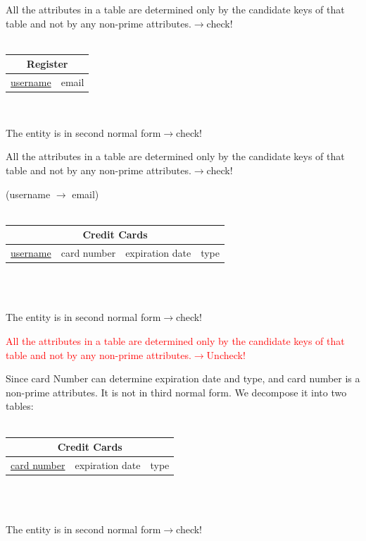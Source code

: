\documentclass[12pt]{article}
\begin{document}
\par All the attributes in a table are determined only by the candidate keys of that table and not by any non-prime attributes.\hfill $\rightarrow$check!\\
~\\
\begin{tabularx}{\textwidth}{|X|X|}
\hline
\multicolumn{2}{|c|}{Register}\\\hline
\underline{username} & email\\\hline
\end{tabularx}
~\\
\par The entity is in second normal form\hfill $\rightarrow$check!
\par All the attributes in a table are determined only by the candidate keys of that table and not by any non-prime attributes.\hfill $\rightarrow$check!
\par (username $\rightarrow$ email)\\
~\\
\begin{tabularx}{\textwidth}{|X|X|X|X|}
\hline
\multicolumn{4}{|c|}{Credit Cards}\\\hline
\underline{username} & card number & expiration date & type\\\hline
\end{tabularx}
~\\~\\
\par The entity is in second normal form\hfill $\rightarrow$check!
\par \textcolor{red}{All the attributes in a table are determined only by the candidate keys of that table and not by any non-prime attributes.\hfill $\rightarrow$Uncheck!}
\par Since card Number can determine expiration date and type, and card number is a non-prime attributes. It is not in third normal form. We decompose it into two tables:\\
~\\
\begin{tabularx}{\textwidth}{|X|X|X|}
\hline
\multicolumn{3}{|c|}{Credit Cards}\\\hline
\underline{card number} & expiration date & type\\\hline
\end{tabularx}
~\\~\\
\par The entity is in second normal form\hfill $\rightarrow$check!
\end{document}
